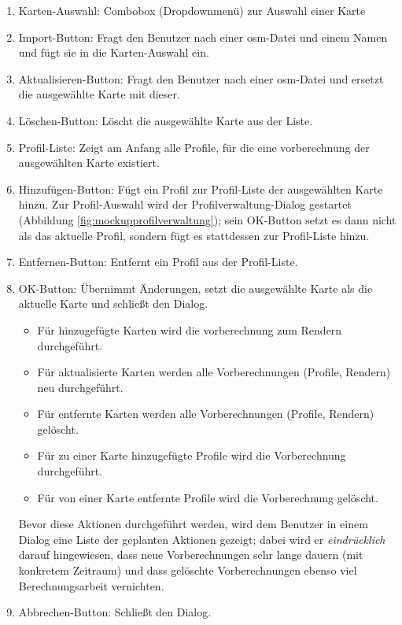 \documentclass[a4paper, 11pt]{article}
\begin{document}
\begin{enumerate}
\item Karten-Auswahl: Combobox (Dropdownmenü) zur Auswahl einer Karte
\item Import-Button: Fragt den Benutzer nach einer \gls{osm}-Datei und einem Namen und fügt sie in die Karten-Auswahl ein.
\item Aktualisieren-Button: Fragt den Benutzer nach einer \gls{osm}-Datei und ersetzt die ausgewählte Karte mit dieser.
\item Löschen-Button: Löscht die ausgewählte Karte aus der Liste.
\item Profil-Liste: Zeigt am Anfang alle Profile, für die eine \gls{vorberechnung} der ausgewählten Karte existiert.
\item Hinzufügen-Button: Fügt ein Profil zur Profil-Liste der ausgewählten Karte hinzu. Zur Profil-Auswahl wird der Profilverwaltung-Dialog gestartet (Abbildung \ref{fig:mockupprofilverwaltung}); sein OK-Button setzt es dann nicht als das aktuelle Profil, sondern fügt es stattdessen zur Profil-Liste hinzu.
\item Entfernen-Button: Entfernt ein Profil aus der Profil-Liste.
\item OK-Button: Übernimmt Änderungen, setzt die ausgewählte Karte als die aktuelle Karte und schließt den Dialog.
  \begin{itemize}
  \item Für hinzugefügte Karten wird die \gls{vorberechnung} zum Rendern durchgeführt.
  \item Für aktualisierte Karten werden alle Vorberechnungen (Profile, Rendern) neu durchgeführt.
  \item Für entfernte Karten werden alle Vorberechnungen (Profile, Rendern) gelöscht.
  \item Für zu einer Karte hinzugefügte Profile wird die Vorberechnung durchgeführt.
  \item Für von einer Karte entfernte Profile wird die Vorberechnung gelöscht.
  \end{itemize}
  Bevor diese Aktionen durchgeführt werden, wird dem Benutzer in einem Dialog eine Liste der geplanten Aktionen gezeigt; dabei wird er \emph{eindrücklich} darauf hingewiesen, dass neue Vorberechnungen sehr lange dauern (mit konkretem Zeitraum) und dass gelöschte Vorberechnungen ebenso viel Berechnungsarbeit vernichten.
\item Abbrechen-Button: Schließt den Dialog.
\end{enumerate}
\end{document}

